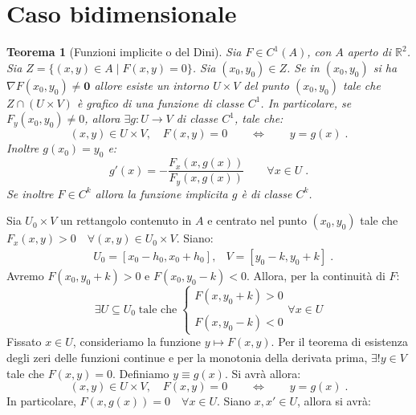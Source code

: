 \documentclass[a4paper,12pt]{report}
\theoremstyle{plain}
\newtheorem{thm}{Teorema}[section]
\theoremstyle{definition}
\theoremstyle{remark}
\numberwithin{equation}{section}
\begin{document}
\section{Caso bidimensionale}
\begin{thm}[Funzioni implicite o del Dini]  Sia $F \in C^1(A)$, con $A$ aperto di $\mathbb{R}^{2}$. Sia $Z=\{(x,y)\in A\;|\;F(x,y)=0\}$. Sia $(x_0,y_0) \in Z$. Se in $(x_0,y_0)$ si ha $\nabla F(x_0,y_0) \ne \mathbf{0}$ allore esiste un intorno $U \times V$ del punto $(x_0,y_0)$ tale che $Z \cap (U \times V)$ è grafico di una funzione di classe $C^1$. In particolare, se $F_y(x_0,y_0)\ne 0$, allora $\exists g:U \to V$ di classe $C^1$, tale che:
\begin{equation}
(x,y) \in U \times V, \quad F(x,y)=0 \qquad \Longleftrightarrow \qquad y=g(x)\;.
\end{equation}
Inoltre $g(x_0)=y_0$ e:
\begin{equation}
g'(x)=-\frac{F_x(x,g(x))}{F_y(x,g(x))} \qquad \forall x \in U\;.
\end{equation}
Se inoltre $F \in C^k$ allora la funzione implicita $g$ è di classe $C^k$.
\end{thm}
\proof Sia $U_0 \times V$ un rettangolo contenuto in $A$ e centrato nel punto $(x_0,y_0)$ tale che $F_x(x,y)>0\quad \forall (x,y)\in U_0\times V$. Siano:
\begin{align}
&U_0=[x_0-h_0,x_0+h_0], &V=[y_0-k,y_0+k]\;.
\end{align}
Avremo $F(x_0,y_0+k)>0$ e $F(x_0,y_0-k)<0$. Allora, per la continuità di $F$:
\begin{equation}
\exists U \subseteq U_0\;\mbox{tale che}\; \begin{cases}
                                            F(x,y_0+k)>0 \\
                                            \\
F(x,y_0-k)<0
                                           \end{cases}
\forall x \in U
\end{equation}
Fissato $x \in U$, consideriamo la funzione $y \mapsto F(x,y)$. Per il teorema di esistenza degli zeri delle funzioni continue e per la 
monotonia della derivata prima, $\exists! y \in V$ tale che $F(x,y)=0$. Definiamo $y\equiv g(x)$. Si avrà allora:
\begin{equation}
(x,y) \in U \times V,\quad F(x,y)=0\qquad  \Longleftrightarrow\qquad  y=g(x)\;.
\end{equation}
In particolare, $F(x,g(x))=0 \quad \forall x \in U$. Siano $x,x' \in U$, allora si avrà:
\end{document}
